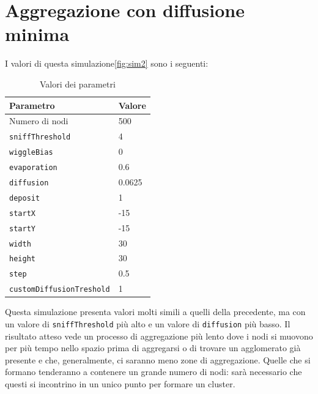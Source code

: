 \section{Aggregazione con diffusione minima}\label{sim2}
I valori di questa simulazione\space \cref{fig:sim2} sono i seguenti:
\begin{table}[ht]
    \centering
    \caption{Valori dei parametri}
    \begin{tabular}{ll}
        \hline
        Parametro                   & Valore \\
        \hline
        Numero di nodi              & 500    \\
        \texttt{sniffThreshold}     & 4      \\
        \texttt{wiggleBias}         & 0      \\
        \texttt{evaporation}        & 0.6    \\
        \texttt{diffusion}          & 0.0625 \\
        \texttt{deposit}            & 1      \\
        \texttt{startX}             & -15    \\
        \texttt{startY}             & -15    \\
        \texttt{width}              & 30     \\
        \texttt{height}             & 30     \\
        \texttt{step}               & 0.5    \\
        \texttt{customDiffusionTreshold} & 1 \\
        \hline
    \end{tabular}\label{tab:parametr2}
\end{table}\newline
Questa simulazione presenta valori molti simili a quelli della precedente, ma con un valore di \texttt{sniffThreshold} più alto e un valore di \texttt{diffusion} più basso.
Il risultato atteso vede un processo di aggregazione più lento dove i nodi si muovono per più tempo nello spazio prima di aggregarsi o di trovare un 
agglomerato già presente e che, generalmente, ci saranno meno zone di aggregazione. Quelle che si formano 
tenderanno a contenere un grande numero di nodi: sarà necessario che questi si incontrino in un unico punto per formare un cluster.

